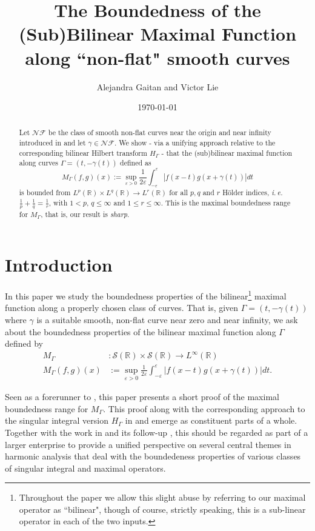 \documentclass{amsart}
\title[Boundedness of the (Sub)Bilinear maximal function]{The Boundedness of the (Sub)Bilinear Maximal Function along ``non-flat" smooth curves}
\author{Alejandra Gaitan and Victor Lie}
\date{\today}
\newcommand{\R}{\mathbb{R}}
\newcommand{\s}{\mathcal{S}}
\newcommand{\ie}{{\em i.$\,$e.$\!$} }
\newcommand{\e}{\varepsilon}
\newcommand{\NF}{\mathcal{NF}}
\theoremstyle{definition}
\theoremstyle{remark}
\numberwithin{equation}{section}
\begin{document}
\begin{abstract}
Let $\NF$ be the class of smooth non-flat curves near the origin and near infinity introduced in \cite{lie2015boundedness} and let $\gamma\in\NF$. We show - via a unifying approach relative to the corresponding bilinear Hilbert transform $H_{\Gamma}$ - that the (sub)bilinear maximal function along curves $\Gamma=(t,-\gamma(t))$ defined as $$M_\Gamma(f,g)(x):=\sup\limits_{\e>0} \frac{1}{2\e} \int_{-\e}^\e |f(x-t)g(x+\gamma(t))|dt$$
is bounded from $L^p(\R)\times L^{q}(\R)\to L^r(\R)$ for all $p, q$ and $r$ H\"older indices, \ie $\frac{1}{p}+\frac{1}{q}=\frac{1}{r}$, with $1<p,\,q\leq\infty$ and $1\le r\leq\infty$. This is the maximal boundedness range for $M_{\Gamma}$, that is, our result is \emph{sharp}.
\end{abstract}

\maketitle

\section{Introduction}


In this paper we study the boundedness properties of the bilinear\footnote{Throughout the paper we allow this slight abuse by referring to our maximal operator as ``bilinear", though of course, strictly speaking, this is a sub-linear operator in each of the two inputs.} maximal function along a properly chosen class of curves. That is, given $\Gamma=(t,-\gamma(t))$ where $\gamma$ is a suitable smooth, non-flat curve near zero and near infinity, we ask about the boundedness properties of the bilinear maximal function along $\Gamma$ defined by
\begin{align}
 M_\Gamma&:\s(\R)\times\s(\R)\to L^{\infty}(\R) \nonumber\\
 M_\Gamma(f,g)(x)&:=\sup\limits_{\e>0} \frac{1}{2\e} \int_{-\e}^\e |f(x-t)g(x+\gamma(t))|dt.\label{definition}
\end{align}

Seen as a forerunner to \cite{lvUA3}, this paper presents a short proof of the maximal boundedness range for $M_{\Gamma}$. This proof along with the corresponding approach to the singular integral version $H_{\Gamma}$ in \cite{lie2015boundedness} and \cite{lie2015triangle} emerge as constituent parts of a whole. Together with the work in \cite{lie2019unifiedap} and its follow-up \cite{lvUA3}, this should be regarded as part of a larger enterprise to provide a unified perspective on several central themes in harmonic analysis that deal with the boundedeness properties of various classes of singular integral and maximal operators.
\end{document}
